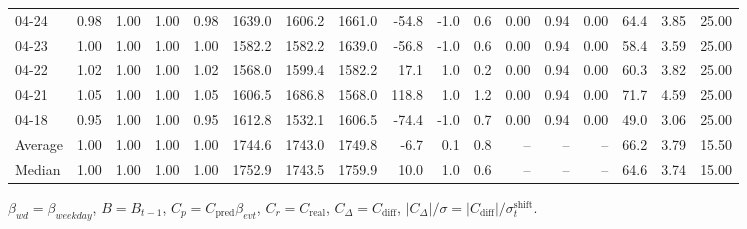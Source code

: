 \begin{threeparttable}
{\begin{tabular}{lrrrrrrrrrrrrrrrr}
  04-24 &         0.98 &           1.00 &          1.00 &          0.98 & 1639.0 & 1606.2 & 1661.0 &      -54.8 &                     -1.0 &                 0.6 &       0.00 &      0.94 &           0.00 &             64.4 &            3.85 &                  25.00 \\
  04-23 &         1.00 &           1.00 &          1.00 &          1.00 & 1582.2 & 1582.2 & 1639.0 &      -56.8 &                     -1.0 &                 0.6 &       0.00 &      0.94 &           0.00 &             58.4 &            3.59 &                  25.00 \\
  04-22 &         1.02 &           1.00 &          1.00 &          1.02 & 1568.0 & 1599.4 & 1582.2 &       17.1 &                      1.0 &                 0.2 &       0.00 &      0.94 &           0.00 &             60.3 &            3.82 &                  25.00 \\
  04-21 &         1.05 &           1.00 &          1.00 &          1.05 & 1606.5 & 1686.8 & 1568.0 &      118.8 &                      1.0 &                 1.2 &       0.00 &      0.94 &           0.00 &             71.7 &            4.59 &                  25.00 \\
  04-18 &         0.95 &           1.00 &          1.00 &          0.95 & 1612.8 & 1532.1 & 1606.5 &      -74.4 &                     -1.0 &                 0.7 &       0.00 &      0.94 &           0.00 &             49.0 &            3.06 &                  25.00 \\
Average &         1.00 &           1.00 &          1.00 &          1.00 & 1744.6 & 1743.0 & 1749.8 &       -6.7 &                      0.1 &                 0.8 &         -- &        -- &             -- &             66.2 &            3.79 &                  15.50 \\
 Median &         1.00 &           1.00 &          1.00 &          1.00 & 1752.9 & 1743.5 & 1759.9 &       10.0 &                      1.0 &                 0.6 &         -- &        -- &             -- &             64.6 &            3.74 &                  15.00 \\
\bottomrule
\end{tabular}
}
\begin{tablenotes}\footnotesize
\item $\beta_{wd}=\beta_{weekday}$, $B=B_{t-1}$,
$C_p=C_{\text{pred}}\beta_{evt}$, $C_r=C_{\text{real}}$,
$C_\Delta=C_{\text{diff}}$, $|C_\Delta|/\sigma=|C_{\text{diff}}|/\sigma_t^{\text{shift}}$.
\end{tablenotes}
\end{threeparttable}
\endgroup
